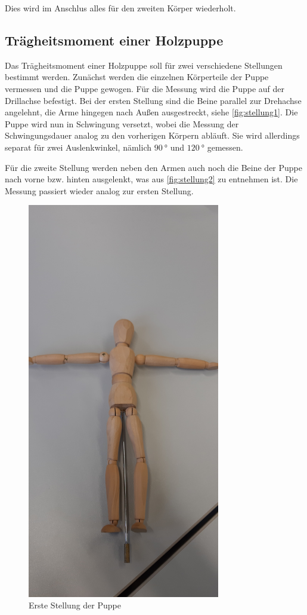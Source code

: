 \noindent
Dies wird im Anschlus alles für den zweiten Körper wiederholt.

\subsection{Trägheitsmoment einer Holzpuppe}
Das Trägheitsmoment einer Holzpuppe soll für zwei verschiedene Stellungen bestimmt werden. 
Zunächst werden die einzelnen Körperteile der Puppe vermessen und die Puppe gewogen.
Für die Messung wird die Puppe auf der Drillachse befestigt. Bei der ersten Stellung sind die Beine parallel zur Drehachse angelehnt, die Arme hingegen nach Außen ausgestreckt, siehe \autoref{fig:stellung1}.
Die Puppe wird nun in Schwingung versetzt, wobei die Messung der Schwingungsdauer analog zu den vorherigen Körpern abläuft. Sie wird allerdings separat für zwei Auslenkwinkel, nämlich $\SI{90}{\degree}$ und $\SI{120}{\degree}$
gemessen.

\noindent
Für die zweite Stellung werden neben den Armen auch noch die Beine der Puppe nach vorne bzw. hinten ausgelenkt, was aus \autoref{fig:stellung2} zu entnehmen ist. Die Messung passiert wieder analog zur ersten Stellung.

\begin{figure}[H]
    \centering
    \includegraphics[width=0.75\textwidth, angle=-90]{Bilder/Stellung1.jpg}
    \caption{Erste Stellung der Puppe}
    \label{fig:stellung1}
  \end{figure}
  
